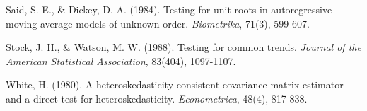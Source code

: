 \documentclass[3p,11pt]{elsarticle}
\begin{document}
\begin{thebibliography}{99}
Said, S. E., \& Dickey, D. A. (1984). Testing for unit roots in autoregressive-moving average models of unknown order. \textit{Biometrika}, 71(3), 599-607.

Stock, J. H., \& Watson, M. W. (1988). Testing for common trends. \textit{Journal of the American Statistical Association}, 83(404), 1097-1107.

White, H. (1980). A heteroskedasticity-consistent covariance matrix estimator and a direct test for heteroskedasticity. \textit{Econometrica}, 48(4), 817-838.

\end{thebibliography}
\end{document}
